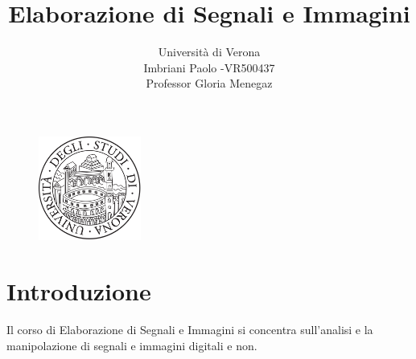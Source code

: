 \documentclass[a4paper]{article}
\title{Elaborazione di Segnali e Immagini}
\author{Università di Verona\\Imbriani Paolo -VR500437\\Professor Gloria Menegaz}
\begin{document}
\begin{figure}
    \centering
    \includegraphics[width=0.3\textwidth]{../UniversityofVerona.png}
    \label{fig:centered-image}
\end{figure}

\maketitle

\pagebreak

\tableofcontents

\pagebreak

\section{Introduzione}
Il corso di Elaborazione di Segnali e Immagini si concentra sull'analisi e 
la manipolazione di segnali e immagini digitali e non.
\end{document}
